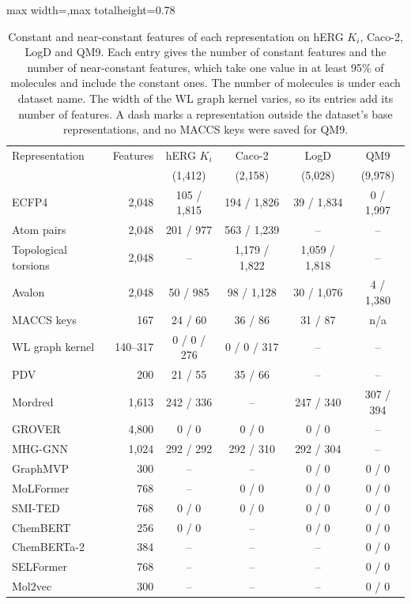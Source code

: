 \begin{table}[htbp]
\centering
\small
\setlength{\tabcolsep}{4pt}
\begin{adjustbox}{max width=\textwidth,max totalheight=0.78\textheight}
\begin{tabular}{lrcccc}
\toprule
Representation & Features & hERG $K_i$ & Caco-2 & LogD & QM9 \\
 & & (1,412) & (2,158) & (5,028) & (9,978) \\
\midrule
ECFP4 & 2,048 & 105 / 1,815 & 194 / 1,826 & 39 / 1,834 & 0 / 1,997 \\
Atom pairs & 2,048 & 201 / 977 & 563 / 1,239 & -- & -- \\
Topological torsions & 2,048 & -- & 1,179 / 1,822 & 1,059 / 1,818 & -- \\
Avalon & 2,048 & 50 / 985 & 98 / 1,128 & 30 / 1,076 & 4 / 1,380 \\
MACCS keys & 167 & 24 / 60 & 36 / 86 & 31 / 87 & n/a \\
WL graph kernel & 140--317 & 0 / 0 / 276 & 0 / 0 / 317 & -- & -- \\
PDV & 200 & 21 / 55 & 35 / 66 & -- & -- \\
Mordred & 1,613 & 242 / 336 & -- & 247 / 340 & 307 / 394 \\
GROVER & 4,800 & 0 / 0 & 0 / 0 & 0 / 0 & -- \\
MHG-GNN & 1,024 & 292 / 292 & 292 / 310 & 292 / 304 & -- \\
GraphMVP & 300 & -- & -- & 0 / 0 & 0 / 0 \\
MoLFormer & 768 & -- & 0 / 0 & 0 / 0 & 0 / 0 \\
SMI-TED & 768 & 0 / 0 & 0 / 0 & 0 / 0 & 0 / 0 \\
ChemBERT & 256 & 0 / 0 & -- & 0 / 0 & 0 / 0 \\
ChemBERTa-2 & 384 & -- & -- & -- & 0 / 0 \\
SELFormer & 768 & -- & -- & -- & 0 / 0 \\
Mol2vec & 300 & -- & -- & -- & 0 / 0 \\
\bottomrule
\end{tabular}
\end{adjustbox}
\caption[Constant and near-constant features per representation, part 1.]{Constant and near-constant features of each representation on hERG $K_i$, Caco-2, LogD and QM9. Each entry gives the number of constant features and the number of near-constant features, which take one value in at least 95\% of molecules and include the constant ones. The number of molecules is under each dataset name. The width of the WL graph kernel varies, so its entries add its number of features. A dash marks a representation outside the dataset's base representations, and no MACCS keys were saved for QM9.}
\label{tab:constant_features}
\end{table}

